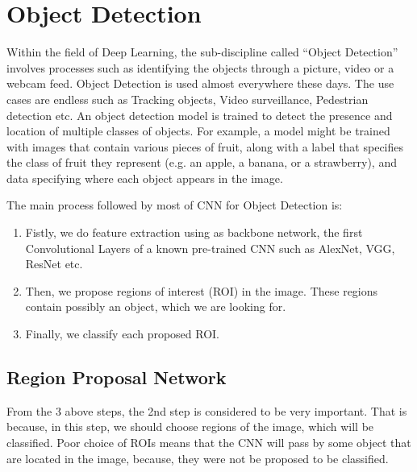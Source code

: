 \documentclass{report}
\begin{document}
\section{Object Detection}
Within the field of Deep Learning, the sub-discipline called “Object Detection” involves processes such as identifying the objects through a picture, video or a webcam feed.
Object Detection is used almost everywhere these days. The use cases are endless such as Tracking objects, Video surveillance, Pedestrian detection etc. 
An object detection model is trained to detect the presence and location of multiple classes of objects. For example, a model might be trained with images that
contain various pieces of fruit, along with a label that specifies the class of fruit they represent (e.g. an apple, a banana, or a strawberry),
and data specifying where each object appears in the image.

The main process followed by most of CNN for Object Detection is:
\begin{enumerate}
\item Fistly, we do feature extraction using as backbone network, the first Convolutional Layers of a known pre-trained CNN such
  as AlexNet, VGG, ResNet etc.
\item Then, we propose regions of interest (ROI) in the image. These regions contain possibly an object, which we are looking for.
\item Finally, we classify each proposed ROI.
\end{enumerate}

\subsection{ Region Proposal Network}

From the 3 above steps, the 2nd step is considered to be very important. That is because, in this step, we should choose regions of
the image, which will be classified. Poor choice of ROIs means that the CNN will pass by some object that are located in the image,
because, they were not be proposed to be classified.
\end{document}
